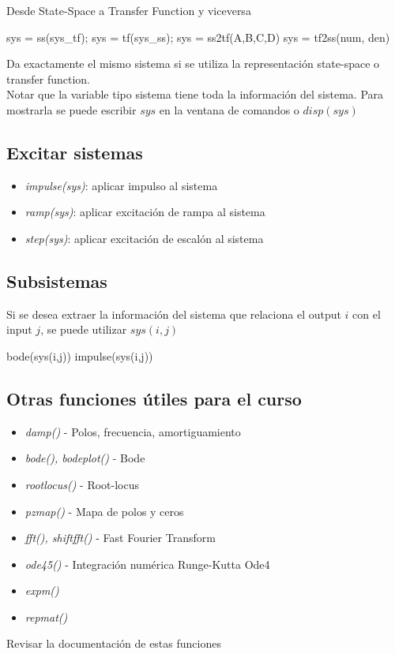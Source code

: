 Desde State-Space a Transfer Function y viceversa
\begin{verbatimg}
    sys = ss(sys_tf);       %
    sys = tf(sys_ss);       %
    sys = ss2tf(A,B,C,D)    %
    sys = tf2ss(num, den)   %
\end{verbatimg}

\noindent Da exactamente el mismo sistema si se utiliza la representación state-space o transfer function. \\

\noindent Notar que la variable tipo sistema tiene toda la información del sistema. Para mostrarla se puede escribir $sys$ en la ventana de comandos o $disp(sys)$

\subsection{Excitar sistemas}
\begin{itemize}
    \item \emph{impulse(sys)}: aplicar impulso al sistema
    \item \emph{ramp(sys)}: aplicar excitación de rampa al sistema
    \item \emph{step(sys)}: aplicar excitación de escalón al sistema
\end{itemize}

\subsection{Subsistemas}
\noindent Si se desea extraer la información del sistema que relaciona el output $i$ con el input $j$, se puede utilizar $sys(i,j)$
\begin{verbatimg}
    bode(sys(i,j)) %
    impulse(sys(i,j)) %
\end{verbatimg}

\subsection{Otras funciones útiles para el curso}
\begin{itemize}
    \item \emph{damp()} - Polos, frecuencia, amortiguamiento
    \item \emph{bode(), bodeplot()} - Bode
    \item \emph{rootlocus()} - Root-locus
    \item \emph{pzmap()} - Mapa de polos y ceros
    \item \emph{fft(), shiftfft()} - Fast Fourier Transform
    \item \emph{ode45()} - Integración numérica Runge-Kutta Ode4
    \item \emph{expm()}
    \item \emph{repmat()}
\end{itemize}

\noindent Revisar la documentación de estas funciones
